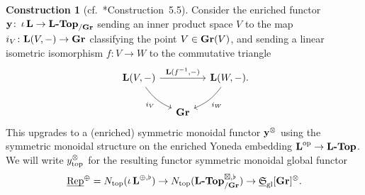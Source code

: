 \documentclass[reqno]{memo-l}
\theoremstyle{mythm}
\theoremstyle{definition}
\newtheorem{constr}[thm]{Construction}
\numberwithin{equation}{section}
\newcommand{\gl}{\textup{gl}}
\renewcommand{\top}{{\textup{top}}}
\newcommand{\Ntop}{{N_\textup{top}}}
\newcommand{\cat}[1]{\textbf{\textup{#1}}}
\newcommand{\op}{{\textup{op}}}
\DeclareMathOperator{\core}{\iota}
\newcommand{\dual}{\flat}
\newcommand{\ulhelper}[2]{\underline{\setbox0=\hbox{$#1#2$}\dp0=0.4pt \box0\relax}}
\newcommand{\ul}[1]{{\mathpalette\ulhelper{#1}}\hbox{\rule[-2pt]{0pt}{0pt}}}
\newcommand{\myS}{{{\mathfrak S\kern-.4pt}}}
\newcommand{\Vect}{\textup{Rep}}
\begin{document}
\begin{constr}[cf.~\cite{juran-thesis}*{Construction~5.5}]
    Consider the enriched functor $\cat{y}\colon\core\cat{L}\to\cat{$\cat{L}$-Top}_{/\cat{Gr}}$ sending an inner product space $V$ to the map $i_V\colon\cat{L}(V,-)\to\cat{Gr}$ classifying the point $V\in\cat{Gr}(V)$, and sending a linear isometric isomorphism $f\colon V\to W$ to the commutative triangle
    \[
        \begin{tikzcd}[column sep=small]
            \cat{L}(V,-)\arrow[rr,"{\cat{L}(f^{-1},-)}"]\arrow[dr, bend right=15pt,"i_V"']&&\cat{L}(W,-)\rlap.\arrow[dl,bend left=15pt,"i_W"]\\
            & \cat{Gr}
        \end{tikzcd}
    \]
    This upgrades to a (enriched) symmetric monoidal functor $\cat{y}^\otimes$ using the symmetric monoidal structure on the enriched Yoneda embedding $\cat{L}^\op\to\cat{$\cat{L}$-Top}$. We will write $y_\top^\otimes$ for the resulting functor symmetric monoidal global functor 
    \begin{equation}\label{eq:ytop}
        \ul\Vect^\oplus=\Ntop(\core\cat{L}^{\oplus,\dual})\to\Ntop(\cat{$\cat{L}$-Top}_{/\cat{Gr}}^{\boxtimes,\dual})\to\ul\myS_\gl[\cat{Gr}]^\otimes.
    \end{equation}
\end{constr}
\end{document}
